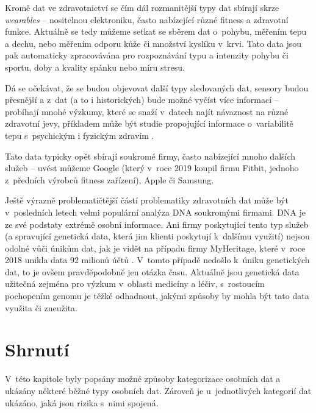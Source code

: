 Kromě dat ve zdravotnictví se čím dál rozmanitější typy dat sbírají skrze \textit{wearables} -- nositelnou elektroniku, často nabízející různé fitness a zdravotní funkce. Aktuálně se tedy můžeme setkat se sběrem dat o~pohybu, měřením tepu a dechu, nebo měřením odporu kůže či množství kyslíku v~krvi.
Tato data jsou pak automaticky zpracovávána pro rozpoznávání typu a intenzity pohybu či sportu, doby a kvality spánku nebo míru stresu.

Dá se očekávat, že se budou objevovat další typy sledovaných dat, sensory budou přesnější a z~dat (a to i historických) bude možné vyčíst více informací -- probíhají mnohé výzkumy, které se snaží v~datech najít návaznost na různé zdravotní jevy, příkladem může být studie propojující informace o~variabilitě tepu s~psychickým i fyzickým zdravím \citep{heart-rate-health}.

Tato data typicky opět sbírají soukromé firmy, často nabízející mnoho dalších služeb -- uvést můžeme Google (který v~roce 2019 koupil firmu Fitbit, jednoho z~předních výrobců fitness zařízení), Apple či Samsung.

Ještě výrazně problematičtější částí problematiky zdravotních dat může být v~posledních letech velmi populární analýza DNA soukromými firmami. DNA je ze své podstaty extrémě osobní informace. Ani firmy poskytující tento typ služeb (a spravující genetická data, která jim klienti poskytují k~dalšímu využití) nejsou odolné vůči únikům dat, jak je vidět na případu firmy MyHeritage, které v~roce 2018 unikla data 92 milionů účtů \citep{myheritage-leak}. V~tomto případě nedošlo k~úniku genetických dat, to je ovšem pravděpodobně jen otázka času. Aktuálně jsou genetická data užitečná zejména pro výzkum v~oblasti medicíny a léčiv, s~rostoucím pochopením genomu je těžké odhadnout, jakými způsoby by mohla být tato data využita či zneužita.


\section*{Shrnutí}
V~této kapitole byly popsány možné způsoby kategorizace osobních dat a ukázány některé běžné typy osobních dat.
Zároveň je u~jednotlivých kategorií dat ukázáno, jaká jsou rizika s~nimi spojená.
